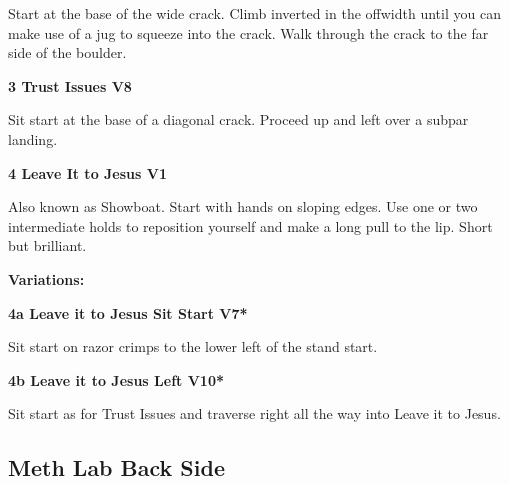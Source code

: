 \begin{multicols}{2}
					\begin{adjustwidth}{0.5cm}{}				
					Start at the base of the wide crack. Climb inverted in the offwidth until you can make use of a jug to squeeze into the crack. Walk through the crack to the far side of the boulder.
					\end{adjustwidth}
					\label{rt:Trust Issues}
\colorbox{Goldenrod!50}{
\parbox{0.95\linewidth}{
\textbf{
3 Trust Issues V8  \warn \warn 
}
}
}

					\begin{adjustwidth}{0.5cm}{}				
					Sit start at the base of a diagonal crack. Proceed up and left over a subpar landing.
					\end{adjustwidth}
					\label{rt:Leave It to Jesus}
\colorbox{green!20}{
\parbox{0.95\linewidth}{
\textbf{
4 Leave It to Jesus V1     
}
}
}

					\begin{adjustwidth}{0.5cm}{}				
					Also known as Showboat. Start with hands on sloping edges. Use one or two intermediate holds to reposition yourself and make a long pull to the lip. Short but brilliant.
					\end{adjustwidth}
						\begin{adjustwidth}{0.5cm}{}				
						\textbf{Variations:} \newline
							\label{vr:Leave it to Jesus Sit Start}
\colorbox{Goldenrod!50}{
\parbox{0.95\linewidth}{
\textbf{
4a Leave it to Jesus Sit Start V7*  
}
}
}

							\begin{adjustwidth}{0.5cm}{}				
							Sit start on razor crimps to the lower left of the stand start.
							\end{adjustwidth}
							\label{vr:Leave it to Jesus Left}
\colorbox{red!20}{
\parbox{0.95\linewidth}{
\textbf{
4b Leave it to Jesus Left V10*  
}
}
}

							\begin{adjustwidth}{0.5cm}{}				
							Sit start as for Trust Issues and traverse right all the way into Leave it to Jesus.
							\end{adjustwidth}
						\end{adjustwidth}

			\subsection*{Meth Lab Back Side}\label{bf:Meth Lab Back Side}
						

\end{multicols}
